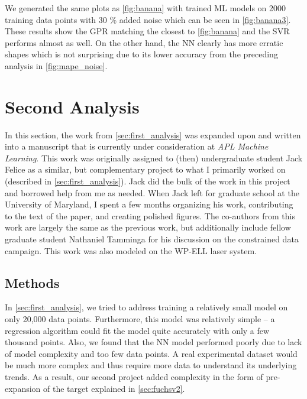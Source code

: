 We generated the same plots as \autoref{fig:banana} with trained \gls{ML} models on 2000 training data points with 30 \% added noise which can be seen in \autoref{fig:banana3}. These results show the \gls{GPR} matching the closest to \autoref{fig:banana} and the \gls{SVR} performs almost as well. On the other hand, the \gls{NN} clearly has more erratic shapes which is not surprising due to its lower accuracy from the preceding analysis in \autoref{fig:mape_noise}. 

\section{Second Analysis} \label{sec:second_analysis}

In this section, the work from \autoref{sec:first_analysis} was expanded upon and written into a manuscript that is currently under consideration at \emph{APL Machine Learning}. This work was originally assigned to (then) undergraduate student Jack Felice as a similar, but complementary project to what I primarily worked on (described in \autoref{sec:first_analysis}). Jack did the bulk of the work in this project and borrowed help from me as needed. When Jack left for graduate school at the University of Maryland, I spent a few months organizing his work, contributing to the text of the paper, and creating polished figures. The co-authors from this work are largely the same as the previous work, but additionally include fellow graduate student Nathaniel Tamminga for his discussion on the constrained data campaign. This work was also modeled on the \gls{WP-ELL} laser system.

\subsection{Methods}
In \autoref{sec:first_analysis}, we tried to address training a relatively small model on only 20,000 data points. Furthermore, this model was relatively simple -- a regression algorithm could fit the model quite accurately with only a few thousand points. Also, we found that the \gls{NN} model performed poorly due to lack of model complexity and too few data points. A real experimental dataset would be much more complex and thus require more data to understand its underlying trends. As a result, our second project added complexity in the form of pre-expansion of the target explained in \autoref{sec:fuchsv2}. 

